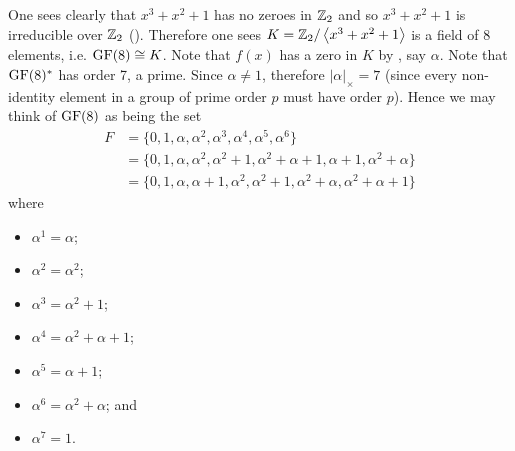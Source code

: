 \begin{example}\label{example-GF8-analysis}
    One sees clearly that $x^3 + x^2 + 1$ has no zeroes in $\mathbb{Z}_2$ and so $x^3 + x^2 + 1$ is irreducible over $\mathbb{Z}_2$ (). Therefore one sees $K = \mathbb{Z}_2/\left\langle x^3+x^2+1\right\rangle$ is a field of 8 elements, i.e. $\mathrm{GF}(8) \cong K$. Note that $f(x)$ has a zero in $K$ by , say $\alpha$. Note that $\mathrm{GF}(8)^\ast$ has order 7, a prime. Since $\alpha \neq 1$, therefore $|\alpha|_\times = 7$ (since every non-identity element in a group of prime order $p$ must have order $p$). Hence we may think of $\mathrm{GF}(8)$ as being the set
    \begin{align*}
        F &= \{0, 1, \alpha, \alpha^2, \alpha^3, \alpha^4, \alpha^5, \alpha^6\}\\
        &= \{0, 1, \alpha, \alpha^2, \alpha^2 + 1, \alpha^2 + \alpha + 1, \alpha + 1, \alpha^2 + \alpha\}\\
        &= \{0, 1, \alpha, \alpha + 1, \alpha^2, \alpha^2 + 1, \alpha^2 + \alpha, \alpha^2 + \alpha + 1\}
    \end{align*}
    where
    \begin{multicols}{2}
        \begin{itemize}
            \item $\alpha^1 = \alpha$;
            \item $\alpha^2 = \alpha^2$;
            \item $\alpha^3 = \alpha^2 + 1$;
            \item $\alpha^4 = \alpha^2 + \alpha + 1$;
            \item $\alpha^5 = \alpha + 1$;
            \item $\alpha^6 = \alpha^2 + \alpha$; and
            \item $\alpha^7 = 1$.
        \end{itemize}
    \end{multicols}


\end{example}

